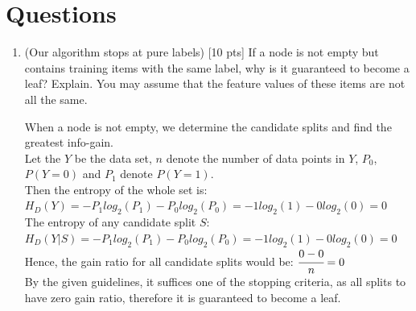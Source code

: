 \documentclass[a4paper]{article}
\theoremstyle{definition}
\newenvironment{soln}{
    \leavevmode\color{blue}\ignorespaces
}{}
\begin{document}
\section{Questions}
\begin{enumerate}
\item (Our algorithm stops at pure labels) [10 pts] If a node is not empty but contains training items with the same label, why is it guaranteed to become a leaf?  Explain. You may assume that the feature values of these items are not all the same. \\
\begin{soln}
When a node is not empty, we determine the candidate splits and find the greatest info-gain. \\ Let the $Y$ be the data set, $n$ denote the number of data points in $Y$, $P_0$, $P(Y=0)$ and $P_1$ denote $P(Y=1)$. \\ Then the entropy of the whole set is: \\ $H_D(Y) = -P_1log_2(P_1) - P_0log_2(P_0) = - 1log_2(1) - 0log_2(0) = 0 $ \\ 
The entropy of any candidate split $S$: \\ $ H_D(Y|S) = -P_1log_2(P_1) - P_0log_2(P_0) = - 1log_2(1) - 0log_2(0) = 0 $ \\ Hence, the gain ratio for all candidate splits would be: $ \cfrac{0 - 0}{n} = 0 $ \\ By the given guidelines, it suffices one of the stopping criteria, as all splits to have zero gain ratio, therefore it is guaranteed to become a leaf.
\end{soln}



\end{enumerate}
\end{document}
